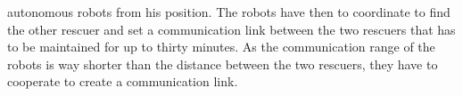 autonomous robots from his position. The robots have then to coordinate to find the other rescuer and set a communication link between the two rescuers that has to be maintained for up to thirty minutes. As the communication range of the robots is way shorter than the distance between the two rescuers, they have to cooperate to create a communication link. 



